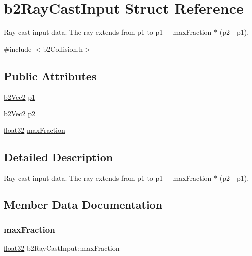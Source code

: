 \hypertarget{structb2_ray_cast_input}{}\section{b2\+Ray\+Cast\+Input Struct Reference}
\label{structb2_ray_cast_input}


Ray-\/cast input data. The ray extends from p1 to p1 + max\+Fraction $\ast$ (p2 -\/ p1).  




{\ttfamily \#include $<$b2\+Collision.\+h$>$}

\subsection*{Public Attributes}
\begin{DoxyCompactItemize}
\item 
\mbox{\hyperlink{structb2_vec2}{b2\+Vec2}} \mbox{\hyperlink{structb2_ray_cast_input_a7254a7062422833b1124fa464ab4caf3}{p1}}
\item 
\mbox{\hyperlink{structb2_vec2}{b2\+Vec2}} \mbox{\hyperlink{structb2_ray_cast_input_a850102c843469781a3a627c871043d0b}{p2}}
\item 
\mbox{\hyperlink{b2_settings_8h_aacdc525d6f7bddb3ae95d5c311bd06a1}{float32}} \mbox{\hyperlink{structb2_ray_cast_input_acb5c88e0ef2c3716a1334611522ab0b2}{max\+Fraction}}
\end{DoxyCompactItemize}


\subsection{Detailed Description}
Ray-\/cast input data. The ray extends from p1 to p1 + max\+Fraction $\ast$ (p2 -\/ p1). 

\subsection{Member Data Documentation}
\mbox{\label{structb2_ray_cast_input_acb5c88e0ef2c3716a1334611522ab0b2}} 
\subsubsection{\texorpdfstring{maxFraction}{maxFraction}}
{\footnotesize\ttfamily \mbox{\hyperlink{b2_settings_8h_aacdc525d6f7bddb3ae95d5c311bd06a1}{float32}} b2\+Ray\+Cast\+Input\+::max\+Fraction}

